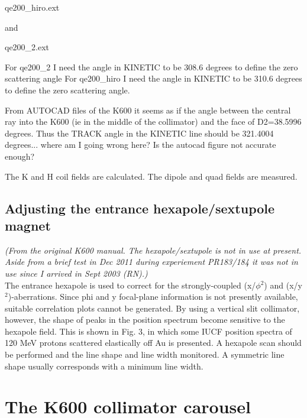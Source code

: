 \documentclass[11pt]{report}
\begin{document}
qe200\_hiro.ext

and 

qe200\_2.ext

For qe200\_2 I need the angle in KINETIC to be 308.6 degrees to define
the zero scattering angle
For qe200\_hiro I need the angle in KINETIC to be 310.6 degrees to
define the zero scattering angle.  

From AUTOCAD files of the K600 it seems as if the angle between
the central ray into the K600 (ie in the middle of the collimator)
and the face of D2=38.5996 degrees.
Thus the TRACK angle in the KINETIC line should be 321.4004 degrees...
where am I going wrong here?
Is the autocad figure not accurate enough?

The K and H coil fields are calculated.
The dipole and quad fields are measured.




\section{Adjusting the entrance hexapole/sextupole magnet}

{\it (From the original K600 manual.
The hexapole/sextupole is not in use at present.
Aside from a brief test in Dec 2011 during experiement PR183/184
it was not in use since I arrived in Sept 2003 (RN).)}\\

The entrance hexapole is used to correct for the strongly-coupled 
(x/$\phi$$^2$) and (x/y$^2$)-aberrations.  Since phi and y focal-plane information is not
presently available, suitable correlation plots cannot be generated.  By using
a vertical slit collimator, however, the shape of peaks in the position 
spectrum become sensitive to the hexapole field.  This is shown in Fig. 3, 
in which some IUCF position spectra of 120 MeV protons scattered elastically
off Au is presented.  A hexapole scan should be performed and the line shape
and line width monitored.  A symmetric line shape usually corresponds with a
minimum line width.









\chapter{The K600 collimator carousel}
\end{document}
